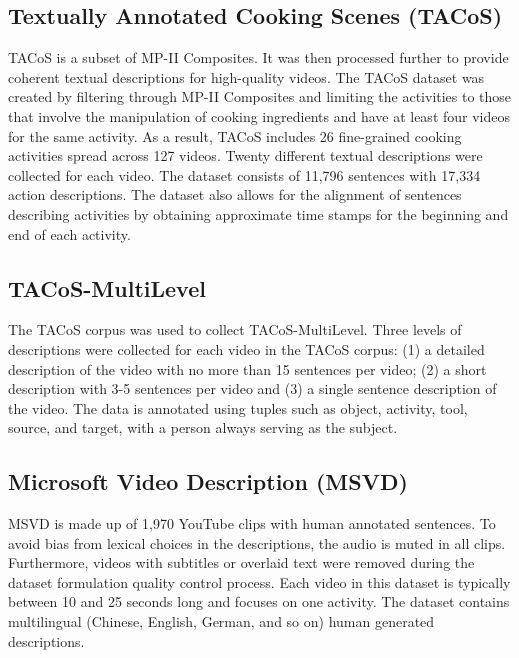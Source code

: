 \subsection{Textually Annotated Cooking Scenes (TACoS)}

\par TACoS is a subset of MP-II Composites. It was then processed further to provide coherent textual descriptions for high-quality videos. The TACoS dataset was created by filtering through MP-II Composites and limiting the activities to those that involve the manipulation of cooking ingredients and have at least four videos for the same activity. As a result, TACoS includes 26 fine-grained cooking activities spread across 127 videos. Twenty different textual descriptions were collected for each video. The dataset consists of 11,796 sentences with 17,334 action descriptions. The dataset also allows for the alignment of sentences describing activities by obtaining approximate time stamps for the beginning and end of each activity.

\subsection{TACoS-MultiLevel}

\par The TACoS corpus was used to collect TACoS-MultiLevel. Three levels of descriptions were collected for each video in the TACoS corpus: (1) a detailed description of the video with no more than 15 sentences per video; (2) a short description with 3-5 sentences per video and (3) a single sentence description of the video. The data is annotated using tuples such as object, activity, tool, source, and target, with a person always serving as the subject.


\subsection{Microsoft Video Description (MSVD)}

\par MSVD is made up of 1,970 YouTube clips with human annotated sentences. To avoid bias from lexical choices in the descriptions, the audio is muted in all clips. Furthermore, videos with subtitles or overlaid text were removed during the dataset formulation quality control process. Each video in this dataset is typically between 10 and 25 seconds long and focuses on one activity. The dataset contains multilingual (Chinese, English, German, and so on) human generated descriptions.



